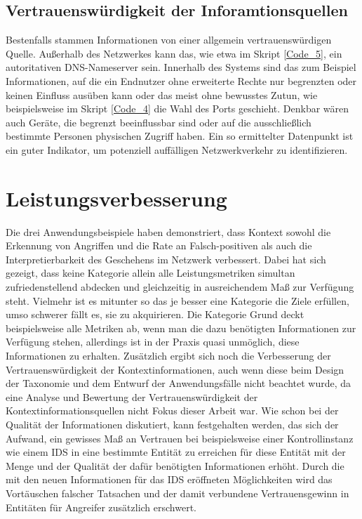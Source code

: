 \subsection{Vertrauenswürdigkeit der Inforamtionsquellen}
Bestenfalls stammen Informationen von einer allgemein vertrauenswürdigen Quelle. Außerhalb des Netzwerkes kann das, wie etwa im Skript \ref{Code_5}, ein autoritativen DNS-Nameserver sein. Innerhalb des Systems sind das zum Beispiel Informationen, auf die ein Endnutzer ohne erweiterte Rechte nur begrenzten oder keinen Einfluss ausüben kann oder das meist ohne bewusstes Zutun, wie beispielsweise im Skript \ref{Code_4} die Wahl des Ports geschieht. Denkbar wären auch Geräte, die begrenzt beeinflussbar sind oder auf die ausschließlich bestimmte Personen physischen Zugriff haben. Ein so ermittelter Datenpunkt ist ein guter Indikator, um potenziell auffälligen Netzwerkverkehr zu identifizieren.
\section{Leistungsverbesserung}
Die drei Anwendungsbeispiele haben demonstriert, dass Kontext sowohl die Erkennung von Angriffen und die Rate an Falsch-positiven als auch die Interpretierbarkeit des Geschehens im Netzwerk verbessert. Dabei hat sich gezeigt, dass keine Kategorie allein alle Leistungsmetriken simultan zufriedenstellend abdecken und gleichzeitig in ausreichendem Maß zur Verfügung steht. Vielmehr ist es mitunter so das je besser eine Kategorie die Ziele erfüllen, umso schwerer fällt es, sie zu akquirieren. Die Kategorie Grund deckt beispielsweise alle Metriken ab, wenn man die dazu benötigten Informationen zur Verfügung stehen, allerdings ist in der Praxis quasi unmöglich, diese Informationen zu erhalten.
Zusätzlich ergibt sich noch die Verbesserung der Vertrauenswürdigkeit der Kontextinformationen, auch wenn diese beim Design der Taxonomie und dem Entwurf der Anwendungsfälle nicht beachtet wurde, da eine Analyse und Bewertung der Vertrauenswürdigkeit der Kontextinformationsquellen nicht Fokus dieser Arbeit war. Wie schon bei der Qualität der Informationen diskutiert, kann festgehalten werden, das sich der Aufwand, ein gewisses Maß an Vertrauen bei beispielsweise einer Kontrollinstanz wie einem IDS in eine bestimmte Entität zu erreichen für diese Entität mit der Menge und der Qualität der dafür benötigten Informationen erhöht. Durch die mit den neuen Informationen für das IDS eröffneten Möglichkeiten wird das Vortäuschen falscher Tatsachen und der damit verbundene Vertrauensgewinn in Entitäten für Angreifer zusätzlich erschwert.
